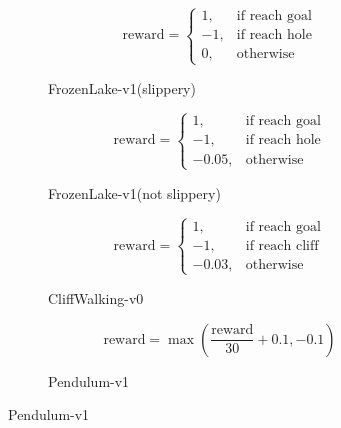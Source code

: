 \documentclass{article}
\begin{document}
\begin{figure}[h]
    \centering
    \begin{subfigure}{0.45\columnwidth}
        \centering
        \begin{equation}
            \text{reward} = \begin{cases}
                1, & \text{if reach goal} \\
                -1, & \text{if reach hole} \\
                0, & \text{otherwise}
            \end{cases} \nonumber
        \end{equation}
        \caption{FrozenLake-v1(slippery)}
        \label{fig:reward_shaping_lake_slippery}
    \end{subfigure}
    \begin{subfigure}{0.45\columnwidth}
        \centering
        \begin{equation}
            \text{reward} = \begin{cases}
                1, & \text{if reach goal} \\
                -1, & \text{if reach hole} \\
                -0.05, & \text{otherwise}
            \end{cases} \nonumber
        \end{equation}
        \caption{FrozenLake-v1(not slippery)}
        \label{fig:reward_shaping_lake_not_slippery}
    \end{subfigure}
    
    \begin{subfigure}{0.45\columnwidth}
        \centering
        \begin{equation}
            \text{reward} = \begin{cases}
                1, & \text{if reach goal} \\
                -1, & \text{if reach cliff} \\
                -0.03, & \text{otherwise}
            \end{cases} \nonumber
        \end{equation}
        \caption{CliffWalking-v0}
        \label{fig:reward_shaping_cliff}
    \end{subfigure}
    \begin{subfigure}{0.45\columnwidth}
        \centering
        \begin{equation}
            \text{reward} = \max\left(\frac{\text{reward}}{30} + 0.1, -0.1\right) \nonumber
        \end{equation}
        \caption{Pendulum-v1}
        \label{fig:reward_pendulum}
    \end{subfigure}


\end{figure}
\end{document}
